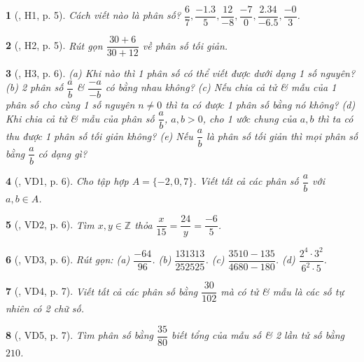 \documentclass{article}
\newtheorem{baitoan}{}
\begin{document}
\begin{baitoan}[\cite{Binh_boi_duong_Toan_6_tap_2}, H1, p. 5]
	Cách viết nào là phân số? $\dfrac{6}{7},\dfrac{-1.3}{5},\dfrac{12}{-8},\dfrac{-7}{0},\dfrac{2.34}{-6.5},\dfrac{-0}{3}$.
\end{baitoan}

\begin{baitoan}[\cite{Binh_boi_duong_Toan_6_tap_2}, H2, p. 5]
	Rút gọn $\dfrac{30 + 6}{30 + 12}$ về phân số tối giản.
\end{baitoan}

\begin{baitoan}[\cite{Binh_boi_duong_Toan_6_tap_2}, H3, p. 6]
	(a) Khi nào thì 1 phân số có thể viết được dưới dạng 1 số nguyên? (b) 2 phân số $\dfrac{a}{b}$ \& $\dfrac{-a}{-b}$ có bằng nhau không? (c) Nếu chia cả tử \& mẫu của 1 phân số cho cùng 1 số nguyên $n\ne0$ thì ta có được 1 phân số bằng nó không? (d) Khi chia cả tử \& mẫu của phân số $\dfrac{a}{b}$, $a,b > 0$, cho 1 ước chung của $a,b$ thì ta có thu được 1 phân số tối giản không? (e) Nếu $\dfrac{a}{b}$ là phân số tối giản thì mọi phân số bằng $\dfrac{a}{b}$ có dạng gì?
\end{baitoan}

\begin{baitoan}[\cite{Binh_boi_duong_Toan_6_tap_2}, VD1, p. 6]
	Cho tập hợp $A = \{-2,0,7\}$. Viết tất cả các phân số $\dfrac{a}{b}$ với $a,b\in A$.
\end{baitoan}

\begin{baitoan}[\cite{Binh_boi_duong_Toan_6_tap_2}, VD2, p. 6]
	Tìm $x,y\in\mathbb{Z}$ thỏa $\dfrac{x}{15} = \dfrac{24}{y} = \dfrac{-6}{5}$.
\end{baitoan}

\begin{baitoan}[\cite{Binh_boi_duong_Toan_6_tap_2}, VD3, p. 6]
	Rút gọn: (a) $\dfrac{-64}{96}$. (b) $\dfrac{131313}{252525}$. (c) $\dfrac{3510 - 135}{4680 - 180}$. (d) $\dfrac{2^4\cdot3^2}{6^2\cdot5}$.
\end{baitoan}

\begin{baitoan}[\cite{Binh_boi_duong_Toan_6_tap_2}, VD4, p. 7]
	Viết tất cả các phân số bằng $ \dfrac{30}{102}$ mà có tử \& mẫu là các số tự nhiên có 2 chữ số.
\end{baitoan}

\begin{baitoan}[\cite{Binh_boi_duong_Toan_6_tap_2}, VD5, p. 7]
	Tìm phân số bằng $\dfrac{35}{80}$ biết tổng của mẫu số \& 2 lần tử số bằng $210$.
\end{baitoan}
\end{document}
